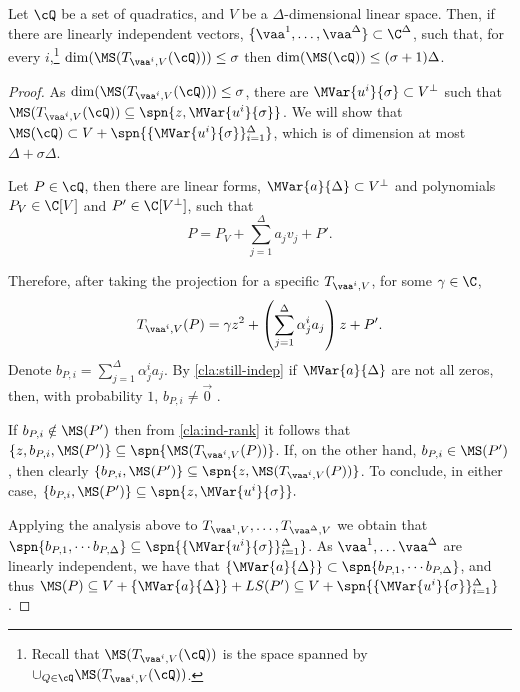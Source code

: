 \begin{claim}\label{cla:z-map-dimension}
Let $\cQ$ be a set of quadratics, and $V$ be a $\Delta$-dimensional linear space. Then, if there are linearly independent vectors, $\{\vaa^1,\dots, \vaa^{\Delta}  \}\subset \C^{\Delta}$, such that, for every $i$,\footnote{Recall that $\MS(T_{\vaa^i,V}(\cQ))$ is the space spanned by $\cup_{Q\in\cQ}\MS(T_{\vaa^i,V}(\cQ))$.} $\dim(\MS(T_{\vaa^i,V}(\cQ)))\leq \sigma$ then $\dim(\MS(\cQ))\leq (\sigma+1) \Delta$.
\end{claim}
\begin{proof}
As $\dim(\MS(T_{\vaa^i,V}(\cQ)))\leq \sigma$, there are $\MVar{u^i}{\sigma} \subset V^{\perp}$ such that $\MS(T_{\vaa^i,V}(\cQ)) \subseteq \spn{z,\MVar{u^i}{\sigma} }$. We will show that $\MS(\cQ) \subset V + \spn{\{\MVar{u^i}{\sigma}\}_{i=1}^{\Delta}}$, which is of dimension at most $\Delta+ \sigma\Delta$.

Let $P \in \cQ$, then there are linear forms, $\MVar{a}{\Delta} \subset V^{\perp}$ and polynomials $P_{V} \in  \C[V]$ and $P'\in \C[V^{\perp}]$, such that
\begin{equation*}
P = P_{V}  + \sum\limits_{j=1}^{\Delta} a_jv_j + P'.
\end{equation*}

Therefore, after taking the projection for a specific $T_{\vaa^i, V}$, for some $\gamma \in \C$,
\begin{equation*}
T_{\vaa^i,V}(P) = \gamma z^2 + \left(\sum\limits_{j=1}^{\Delta} \alpha^i_ja_j\right) z + P'.
\end{equation*}
Denote $b_{P,i} = \sum\limits_{j=1}^{\Delta} \alpha^i_ja_j$. By \autoref{cla:still-indep} if $\MVar{a}{\Delta}$ are not all zeros, then, with probability $1$, $b_{P,i} \neq \vec{0}$ .

If $b_{P,i}\notin \MS(P')$ then from \autoref{cla:ind-rank} it follows that  $\lbrace z, b_{P,i}, \MS(P')\rbrace \subseteq \spn{ \MS(T_{\vaa^i,V}(P))}$. If, on the other hand, $b_{P,i} \in \MS(P')$, then clearly $\lbrace b_{P,i}, \MS(P')\rbrace \subseteq \spn{ z, \MS(T_{\vaa^i,V}(P))}$. To conclude, in either case, $\{b_{P,i},\MS(P')\} \subseteq \spn{z, \MVar{u^i}{\sigma}}.$

Applying the analysis above to $T_{\vaa^1,V},\dots,T_{\vaa^{\Delta},V}$ we obtain that $\spn{b_{P,1}, \cdots b_{P,\Delta}}\subseteq \spn{\{\MVar{u^i}{\sigma}\}_{i=1}^{\Delta}}$. As $\vaa^1,\dots\vaa^\Delta$ are linearly independent, we have that $\{{\MVar{a}{\Delta}}\} \subset \spn{b_{P,1}, \cdots b_{P,\Delta}}$, and thus $\MS(P) \subseteq V + \lbrace\MVar{a}{\Delta}\rbrace + LS(P') \subseteq V + \spn{\{\MVar{u^i}{\sigma}\}_{i=1}^{\Delta}}$.
\end{proof}
